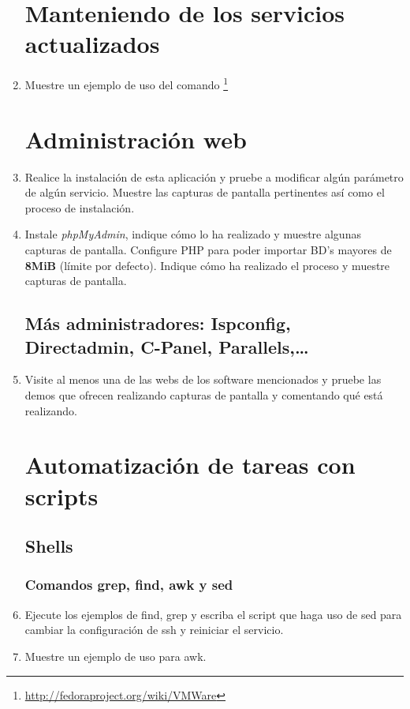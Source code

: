 \documentclass[paper=a4, fontsize=11pt]{scrartcl} %
\numberwithin{equation}{section} %
\numberwithin{figure}{section} %
\numberwithin{table}{section} %
\begin{document}
\begin{enumerate}
	\section{Manteniendo de los servicios actualizados}
	\item Muestre un ejemplo de uso del comando \footnote{\url{http://fedoraproject.org/wiki/VMWare}}
	
	\section{Administración web}
	\item Realice la instalación de esta aplicación y pruebe a modificar algún parámetro de algún
	servicio. Muestre las capturas de pantalla pertinentes así como el proceso de instalación.
	
	\item Instale \textit{phpMyAdmin}, indique cómo lo ha realizado y muestre algunas capturas de
	pantalla. Configure PHP para poder importar BD's mayores de \textbf{8MiB} (límite por defecto).
	Indique cómo ha realizado el proceso y muestre capturas de pantalla.
	
	\subsection{Más administradores: Ispconfig, Directadmin, C-Panel, Parallels,\dots}
	\item Visite al menos una de las webs de los software mencionados y pruebe las demos que ofrecen
	realizando capturas de pantalla y comentando qué está realizando.
	
	\section{Automatización de tareas con scripts}
	\subsection{Shells}
	\subsubsection*{Comandos grep, find, awk y sed}
	\item Ejecute los ejemplos de find, grep y escriba el script que haga uso de sed para cambiar la
	configuración de ssh y reiniciar el servicio.
	
	\item Muestre un ejemplo de uso para awk.
	

\end{enumerate}
\end{document}
